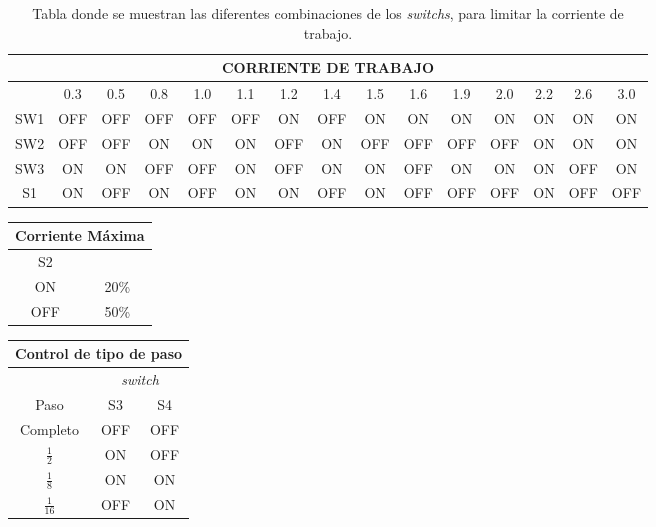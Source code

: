 \begin{table}
	\centering
	\caption{Tabla donde se muestran las diferentes combinaciones de los \textit{switchs}, para limitar la corriente de trabajo.}
	\label{table:corrienteTrabajo}
	\begin{tabular}{|c|c|c|c|c|c|c|c|c|c|c|c|c|c|c|}
		\hline 
		\multicolumn{15}{|c|}{CORRIENTE DE TRABAJO} \\ 
		\hline 
		& 0.3 & 0.5 & 0.8 & 1.0 & 1.1 & 1.2 & 1.4 & 1.5 & 1.6 & 1.9 & 2.0 & 2.2 & 2.6 & 3.0 \\ 
		\hline 
		SW1 & OFF & OFF & OFF & OFF & OFF & ON & OFF & ON & ON & ON & ON & ON & ON & ON \\ 
		\hline 
		SW2 & OFF & OFF & ON & ON & ON & OFF & ON & OFF & OFF & OFF & OFF & ON & ON & ON \\ 
		\hline 
		SW3 & ON & ON & OFF & OFF & ON & OFF & ON & ON & OFF & ON & ON & ON & OFF & ON \\ 
		\hline 
		S1 & ON & OFF & ON & OFF & ON & ON & OFF & ON & OFF & OFF & OFF & ON & OFF & OFF \\ 
		\hline 
	\end{tabular} 
\end{table}
\begin{table}
	\begin{tabular}{|c|c|}
		\hline 
		\multicolumn{2}{|c|}{Corriente Máxima} \\ 
		\hline 
		S2 &  \\ 
		\hline 
		ON & 20\% \\ 
		\hline 
		OFF & 50\% \\ 
		\hline 
	\end{tabular}
	
	\begin{tabular}{|c|c|c|}
		\hline 
		\multicolumn{3}{|c|}{Control de tipo de paso} \\ 
		\hline 
		& \multicolumn{2}{c|}{\textit{switch}} \\ 
		\hline 
		Paso & S3 & S4 \\ 
		\hline 
		Completo & OFF & OFF \\ 
		\hline 
		$\frac{1}{2}$ & ON & OFF \\ 
		\hline 
		$\frac{1}{8}$ & ON & ON \\ 
		\hline 
		$\frac{1}{16}$ & OFF & ON \\ 
		\hline 
	\end{tabular} 
\end{table}